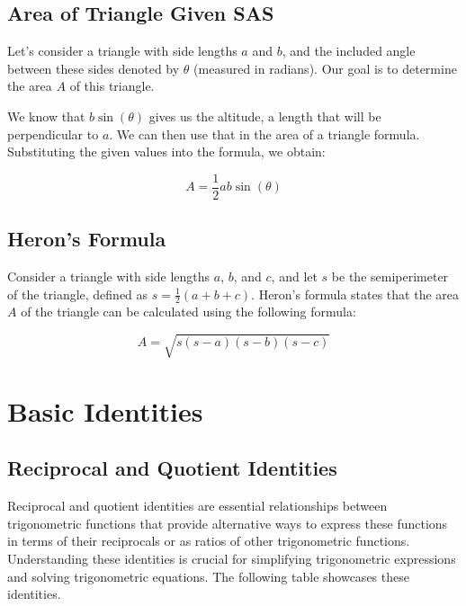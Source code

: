 \documentclass[11pt]{article}
\begin{document}
\subsection{Area of Triangle Given SAS}
Let's consider a triangle with side lengths $a$ and $b$, and the included angle between these sides denoted by $\theta$ (measured in radians). Our goal is to determine the area $A$ of this triangle.

We know that $b\sin(\theta)$ gives us the altitude, a length that will be perpendicular to $a$. We can then use that in the area of a triangle formula. Substituting the given values into the formula, we obtain:

\begin{equation*}
A = \frac{1}{2}ab\sin(\theta)
\end{equation*}

\subsection{Heron's Formula}
Consider a triangle with side lengths $a$, $b$, and $c$, and let $s$ be the semiperimeter of the triangle, defined as $s = \frac{1}{2}(a + b + c)$. Heron's formula states that the area $A$ of the triangle can be calculated using the following formula:

\begin{equation*}
A = \sqrt{s(s - a)(s - b)(s - c)}
\end{equation*}

\section{Basic Identities}

\subsection{Reciprocal and Quotient Identities}

Reciprocal and quotient identities are essential relationships between trigonometric functions that provide alternative ways to express these functions in terms of their reciprocals or as ratios of other trigonometric functions. Understanding these identities is crucial for simplifying trigonometric expressions and solving trigonometric equations. The following table showcases these identities.
\end{document}
